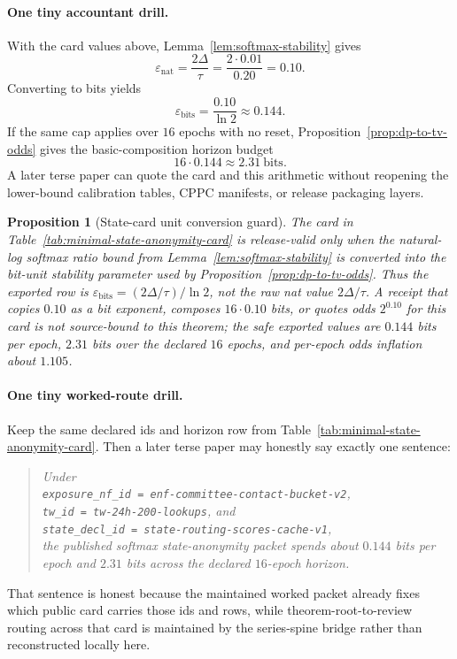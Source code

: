 \documentclass[11pt]{article}
\newtheorem{proposition}{Proposition}
\begin{document}
\paragraph{One tiny accountant drill.}
With the card values above, Lemma~\ref{lem:softmax-stability} gives
\[
\varepsilon_{\mathrm{nat}} = \frac{2\Delta}{\tau} = \frac{2\cdot 0.01}{0.20} = 0.10.
\]
Converting to bits yields
\[
\varepsilon_{\mathrm{bits}} = \frac{0.10}{\ln 2} \approx 0.144.
\]
If the same cap applies over $16$ epochs with no reset, Proposition~\ref{prop:dp-to-tv-odds} gives the basic-composition horizon budget
\[
16\cdot 0.144 \approx 2.31\ \text{bits}.
\]
A later terse paper can quote the card and this arithmetic without reopening the lower-bound calibration tables, CPPC manifests, or release packaging layers.

\begin{proposition}[State-card unit conversion guard]
\label{prop:state-card-unit-guard}
The card in Table~\ref{tab:minimal-state-anonymity-card} is release-valid only when the natural-log softmax ratio bound from Lemma~\ref{lem:softmax-stability} is converted into the bit-unit stability parameter used by Proposition~\ref{prop:dp-to-tv-odds}.  Thus the exported row is $\varepsilon_{\mathrm{bits}}=(2\Delta/\tau)/\ln 2$, not the raw nat value $2\Delta/\tau$.  A receipt that copies $0.10$ as a bit exponent, composes $16\cdot 0.10$ bits, or quotes odds $2^{0.10}$ for this card is not source-bound to this theorem; the safe exported values are $0.144$ bits per epoch, $2.31$ bits over the declared $16$ epochs, and per-epoch odds inflation about $1.105$.
\end{proposition}

\paragraph{One tiny worked-route drill.}
Keep the same declared ids and horizon row from Table~\ref{tab:minimal-state-anonymity-card}. Then a later terse paper may honestly say exactly one sentence:
\begin{quote}\small\emph{Under\\
\nolinkurl{exposure_nf_id = enf-committee-contact-bucket-v2},\\
\nolinkurl{tw_id = tw-24h-200-lookups}, and\\
\nolinkurl{state_decl_id = state-routing-scores-cache-v1},\\
the published softmax state-anonymity packet spends about $0.144$ bits per epoch and $2.31$ bits across the declared $16$-epoch horizon.}\end{quote}
That sentence is honest because the maintained worked packet already fixes which public card carries those ids and rows, while theorem-root-to-review routing across that card is maintained by the series-spine bridge rather than reconstructed locally here.\cite{series:workedexample,series:seriesspines}
\end{document}
